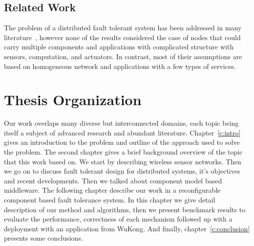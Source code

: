 \subsection{Related Work}

The problem of a distributed fault tolerant system has been addressed in many
literature~\cite{Neumann2010,Lamport2001,Luna2008,Liu2009,Sussman2000,Lynch2002},
however none of the results considered the case of nodes that could carry
multiple components and applications with complicated structure with sensors,
computation, and actuators. In contrast, most of their assumptions
are based on homogeneous network and applications with a few types
of services.

\section{Thesis Organization}

Our work overlaps many diverse but interconnected domains, each topic being 
itself a subject of advanced research and abundant literature.
Chapter~\ref{c:intro} gives an introduction to the problem and outline of the
approach used to solve the problem. The second chapter
gives a brief background overview of the topic that this work based on. 
We start by describing wireless sensor networks. Then we go on to discuss fault
tolerant design for distributed systems, it's objectives and recent
developments. Then we talked about component model based middleware. The
following chapter describe our work in a reconfigurable component based fault
tolerance system. In this chapter we give detail description of our method and
algorithms, then we present benchmark results to evaluate the performance,
correctness of each mechanism followed up with a deployment with an application
from WuKong. And finally, chapter~\ref{c:conclusion} presents some conclusions.
